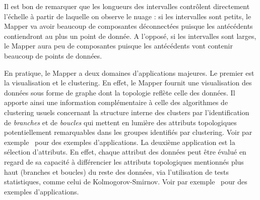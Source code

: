 
Il est bon de remarquer que les longueurs des intervalles contr\^olent directement l'\'echelle \`a partir de laquelle on observe le nuage : si les
intervalles sont petits, le Mapper va avoir beaucoup de composantes d\'econnect\'ees puisque les ant\'ec\'edents contiendront au plus un point de donn\'ee.
A l'oppos\'e, si les intervalles sont larges, le Mapper aura peu de composantes puisque les ant\'ec\'edents vont contenir beaucoup de points de donn\'ees.


En pratique, le Mapper a deux domaines d'applications majeures. Le premier est la visualisation et le clustering.
En effet,  le Mapper fournit une visualisation des donn\'ees sous forme de graphe dont la topologie refl\`ete
celle des donn\'ees. Il apporte ainsi une information compl\'ementaire \`a celle des algorithmes de clustering usuels concernant
la structure interne des clusters 
par l'identification de {\em branches} et de {\em boucles}
qui mettent en lumi\`ere des 
attributs topologiques
potentiellement remarquables dans les groupes identifi\'es par clustering.
Voir par exemple~\cite{Yao09, Lum13, Sarikonda14, Hinks15} pour des exemples d'applications.
La deuxi\`eme application est la s\'election d'attributs. En effet, chaque attribut des donn\'ees peut \^etre \'evalu\'e
en regard de sa capacit\'e \`a diff\'erencier les 
attributs topologiques
mentionn\'es plus haut (branches et boucles)
du reste des donn\'ees, via l'utilisation de tests statistiques, comme celui de Kolmogorov-Smirnov.
Voir par exemple~\cite{Lum13, Nielson15, Rucco15} pour des exemples d'applications.

